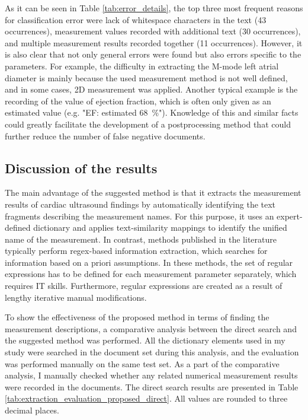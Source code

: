 As it can be seen in Table \ref{tab:error_details}, the top three most frequent reasons for classification error were lack of whitespace characters in the text (43 occurrences), measurement values recorded with additional text (30 occurrences), and multiple measurement results recorded together (11 occurrences). However, it is also clear that not only general errors were found but also errors specific to the parameters. For example, the difficulty in extracting the M-mode left atrial diameter is mainly because the used measurement method is not well defined, and in some cases, 2D measurement was applied. Another typical example is the recording of the value of ejection fraction, which is often only given as an estimated value (e.g. "EF: estimated \SI{68}{\percent}"). Knowledge of this and similar facts could greatly facilitate the development of a postprocessing method that could further reduce the number of false negative documents. 

\subsection{Discussion of the results}
\label{sec:patterson_comparison}

The main advantage of the suggested method is that it extracts the measurement results of cardiac ultrasound findings by automatically identifying the text fragments describing the measurement names. For this purpose, it uses an expert-defined dictionary and applies text-similarity mappings to identify the unified name of the measurement. In contrast, methods published in the literature typically perform regex-based information extraction, which searches for information based on a priori assumptions. In these methods, the set of regular expressions has to be defined for each measurement parameter separately, which requires IT skills. Furthermore, regular expressions are created as a result of lengthy iterative manual modifications.

To show the effectiveness of the proposed method in terms of finding the measurement descriptions, a comparative analysis between the direct search and the suggested method was performed. All the dictionary elements used in my study were searched in the document set during this analysis, and the evaluation was performed manually on the same test set. As a part of the comparative analysis, I manually checked whether any related numerical measurement results were recorded in the documents. The direct search results are presented in Table \ref{tab:extraction_evaluation_proposed_direct}. All values are rounded to three decimal places.

